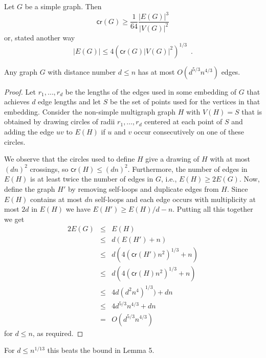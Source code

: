 \documentclass{article}
\newcommand{\cn}{\mathsf{cr}}
\begin{document}
\begin{lem}
Let $G$ be a simple graph.  Then 
\[  \cn (G) \ge \frac{1}{64}\frac{|E(G)|^3}{|V(G)|^2}
\]
or, stated another way 
\[
  |E(G)| \le 4\left(\cn(G)|V(G)|^2\right)^{1/3} \enspace .
\]
\end{lem}

\begin{thm}
Any graph $G$ with distance number $d\le n$ has at most
$O(d^{5/3}n^{4/3})$ edges.
\end{thm}

\begin{proof} 
Let $r_1,\ldots,r_d$ be the lengths of the edges used in some
embedding of $G$ that achieves $d$ edge lengths and let $S$ be the set
of points used for the vertices in that embedding. 
Consider the non-simple multigraph graph $H$ with $V(H)=S$ that is
obtained by drawing circles of radii $r_1,\ldots,r_d$ centered at each
point of $S$ and adding the edge $uv$ to $E(H)$ if $u$ and $v$ occur
consecutively on one of these circles.

We observe that the circles used to define $H$ give a drawing of $H$
with at most $(dn)^2$ crossings, so $\cn(H)\le (dn)^2$. Furthermore,
the number of edges in $E(H)$ is at least twice the number of edges in
$G$, i.e., $E(H) \ge 2E(G)$.  Now, define the graph $H'$ by removing
self-loops and duplicate edges from $H$.  Since $E(H)$ contains at
most $dn$ self-loops and each edge occurs with multiplicity at most
$2d$ in $E(H)$ we have $E(H') \ge E(H)/d - n$.  Putting all this
together we get
\begin{eqnarray*}
   2E(G) &\le& E(H) \\
         &\le& d(E(H')+n) \\
         &\le& d\left(4\left(\cn(H') n^2\right)^{1/3}+n\right) \\
         &\le& d\left(4\left(\cn(H) n^2\right)^{1/3}+n\right) \\
         &\le& 4d(d^2n^4)^{1/3})+dn \\
         &\le& 4d^{5/3}n^{4/3}+dn \\
         & = & O(d^{5/3}n^{4/3})
\end{eqnarray*}
for $d\le n$, as required.
\end{proof}
For $d\le n^{1/13}$ this beats the bound in Lemma 5.
\end{document}
